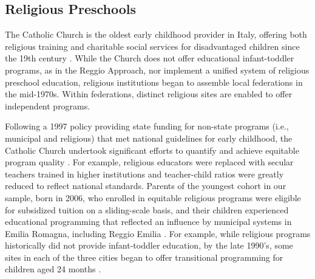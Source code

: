 \subsection{Religious Preschools}

The Catholic Church is the oldest early childhood provider in Italy, offering both religious training and charitable social services for disadvantaged children since the 19th century \citep{OECD_2001_Italy-Country-Note}. While the Church does not offer educational infant-toddler programs, as in the Reggio Approach, nor implement a unified system of religious preschool education, religious institutions began to assemble local federations in the mid-1970s. Within federations, distinct religious sites are enabled to offer independent programs. 


Following a 1997 policy providing state funding for non-state programs (i.e., municipal and religious) that met national guidelines for early childhood, the Catholic Church undertook significant efforts to quantify and achieve equitable program quality \citep{Malizia-Cicatelli_2011_BOOK_Catholic-School}. For example, religious educators were replaced with secular teachers trained in higher institutions and teacher-child ratios were greatly reduced to reflect national standards. Parents of the youngest cohort in our sample, born in 2006, who enrolled in equitable religious programs were eligible for subsidized tuition on a sliding-scale basis, and their children experienced educational programming that reflected an influence by municipal systems in Emilia Romagna, including Reggio Emilia \citep{Hohnerlein_2009_Paradox-Public-Preschools,OECD_2001_Italy-Country-Note}. For example, while religious programs historically did not provide infant-toddler education, by the late 1990's, some sites in each of the three cities began to offer transitional programming for children aged 24 months \citep{Malizia-Cicatelli_2011_BOOK_Catholic-School,CEHD_2016_Historical-Analysis}. 

